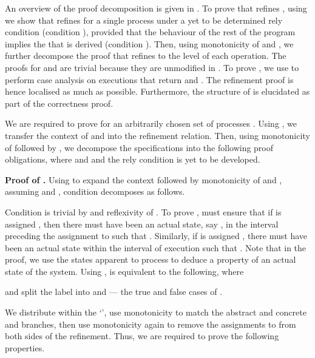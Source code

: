 \documentclass{article}
\theoremstyle{plain}
\newcounter{thm}
\theoremstyle{definition}
\begin{document}
An overview of the proof decomposition is given in
. 
To prove that  refines , using
 we show that  refines
 for a single process  under a yet to be
determined rely condition  (condition ), provided that
the behaviour of the rest of the program implies the  that is
derived (condition ). Then, using monotonicity of 
and , we further decompose the proof that
 refines  to the level of each
operation. The proofs for  and  are trivial
because they are unmodified in . To prove , we use  to perform case analysis on
executions that return  and . The refinement proof is
hence localised as much as possible.  Furthermore, the structure of
 is elucidated as part of the correctness proof.








We are required to prove 
for an arbitrarily chosen set of processes . Using
, we transfer the context  of  and  into the
refinement relation. Then, using monotonicity of  followed by
, we decompose the specifications into the
following proof obligations, where  and 
and the rely condition  is yet to be developed.


\noindent \textbf{Proof of .}
Using  to expand the context followed by
monotonicity of  and , assuming  and , condition 
decomposes as follows.
  





Condition  is trivial by  and
reflexivity of . To prove , must ensure that
if  is assigned , then there must have been an actual
state, say , in the interval preceding the assignment to
 such that . Similarly, if  is
assigned , there must have been an actual state  within
the interval of execution such that . Note
that in the proof, we use the states apparent to process  to deduce
a property of an actual state of the system. Using
,  is equivalent to the
following, where\smallskip

\noindent
\quad
\hfill\smallskip

\noindent
and split the label  into  and  --- the true and
false cases of .

\noindent
We distribute  within the `', use monotonicity to match
the abstract and concrete  and  branches, then use
monotonicity again to remove the assignments to  from both
sides of the refinement. Thus, we are required to prove the following
properties.
\end{document}
